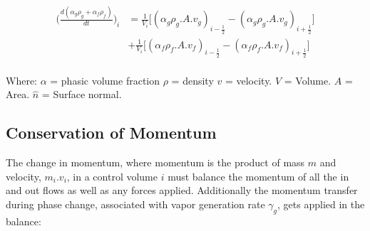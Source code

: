 \documentclass[11pt,letterpaper,titlepage]{article}
\newcommand{\half}{\frac{1}{2}}
\begin{document}
\begin{equation}
\begin{aligned}
\biggr ( \frac{d(\alpha_g \rho_g+\alpha_f\rho_f)}{dt} \biggr )_i 
&= \frac{1}{V_i}\biggr[ (\alpha_g\rho_g.A.v_g)_{i-\half}-(\alpha_g\rho_g.A.v_g)_{i+\half} \biggr]\\
&+ \frac{1}{V_i}\biggr[ (\alpha_f\rho_f.A.v_f)_{i-\half}-(\alpha_f\rho_f.A.v_f)_{i+\half} \biggr]\\
\end{aligned}
\end{equation}

\noindent 
Where: 
\newline \noindent $\alpha$ \quad = phasic volume fraction
\newline \noindent $\rho$ \quad = density
\newline \noindent $v$ \quad = velocity.
\newline \noindent $V$ \quad = Volume.
\newline \noindent $A$ \quad = Area.
\newline \noindent $\hat{n}$ \quad = Surface normal.

\subsection{Conservation of Momentum}
The change in momentum, where momentum is the product of mass $m$ and velocity, $m_i.v_{i}$, in a control volume $i$ must balance the momentum of all the in and out flows as well as any forces applied. Additionally the momentum transfer during phase change, associated with vapor generation rate $\gamma_g$, gets applied in the balance:
\end{document}
